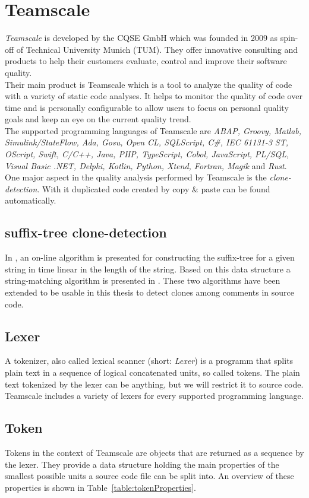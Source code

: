 \section{Teamscale}
\label{section:teamscale}
\textit{Teamscale} is developed by the CQSE GmbH which was founded in 2009 as spin-off of Technical University Munich (TUM). They offer innovative consulting and products to help their customers evaluate, control and improve their software quality.\\
Their main product is Teamscale which is a tool to analyze the quality of code with a variety of static code analyses. It helps to monitor the quality of code over time and is personally configurable to allow users to focus on personal quality goals and keep an eye on the current quality trend.\\
The supported programming languages of Teamscale are \textit{ABAP, Groovy, Matlab, Simulink/StateFlow, Ada, Gosu, Open CL, SQLScript, C\#, IEC 61131-3 ST, OScript, Swift, C/C++, Java, PHP, TypeScript, Cobol, JavaScript, PL/SQL, Visual Basic .NET, Delphi, Kotlin, Python, Xtend, Fortran, Magik} and \textit{Rust}.\\
One major aspect in the quality analysis performed by Teamscale is the \textit{clone-detection}. With it duplicated code created by copy \& paste can be found automatically.

\subsection{suffix-tree clone-detection}
In \cite{Ukkonen1995}, an on-line algorithm is presented for constructing the suffix-tree for a given string in time linear in the length of the string. Based on this data structure a string-matching algorithm is presented in \cite{Ukkonen1993}. These two algorithms have been extended to be usable in this thesis to detect clones among comments in source code.

\subsection{Lexer}
A tokenizer, also called lexical scanner (short: \textit{Lexer}) is a programm that splits plain text in a sequence of logical concatenated units, so called tokens. The plain text tokenized by the lexer can be anything, but we will restrict it to source code. Teamscale includes a variety of lexers for every supported programming language. 

\subsection{Token}
\label{section:token}
Tokens in the context of Teamscale are objects that are returned as a sequence by the lexer. They provide a data structure holding the main properties of the smallest possible units a source code file can be split into. An overview of these properties is shown in Table~\ref{table:tokenProperties}.


